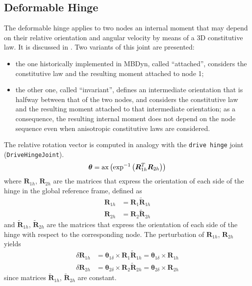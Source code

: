 \documentclass[10pt,dvips,fleqn,subeqn]{report}
\newcommand{\T}[1]{\bm{#1}}
\begin{document}
\subsection{Deformable Hinge}
\label{sec:constraints:deformable:deformable hinge}
The deformable hinge applies to two nodes an internal moment that may depend
on their relative orientation and angular velocity by means 
of a 3D constitutive law.
It is discussed in \cite{INVJOINT}.
Two variants of this joint are presented:
\begin{itemize}
\item the one historically implemented in MBDyn, called ``attached'',
considers the constitutive law and the resulting moment attached to node 1;
\item the other one, called ``invariant'', defines an intermediate
orientation that is halfway between that of the two nodes, and considers
the constitutive law and the resulting moment attached to that intermediate
orientation; as a consequence, the resulting internal moment does not depend
on the node sequence even when anisotropic constitutive laws are considered.
\end{itemize}
The relative rotation vector is computed in analogy with the \texttt{drive hinge}
joint (\texttt{DriveHingeJoint}).
\begin{equation}
	\T{\theta} =
	\llk{ax}\plbr{\llk{exp}^{-1}\plbr{\T{R}_{1h}^T \T{R}_{2h}}}
\end{equation}
where $\T{R}_{1h}$, $\T{R}_{2h}$ are the matrices that express
the orientation of each side of the hinge in the global reference frame,
defined as
\begin{subequations}
\begin{align}
	\T{R}_{1h} &= \T{R}_{1} \tilde{\T{R}}_{1h} \\
	\T{R}_{2h} &= \T{R}_{2} \tilde{\T{R}}_{2h}
\end{align}
\end{subequations}
and $\tilde{\T{R}}_{1h}$, $\tilde{\T{R}}_{2h}$ are the matrices
that express the orientation of each side of the hinge with respect
to the corresponding node.
The perturbation of $\T{R}_{1h}$, $\T{R}_{2h}$ yields
\begin{subequations}
\begin{align}
	\delta \T{R}_{1h} &= \T{\theta}_{1\delta} \times \T{R}_{1} \tilde{\T{R}}_{1h}
		= \T{\theta}_{1\delta} \times \T{R}_{1h} \\
	\delta \T{R}_{2h} &= \T{\theta}_{2\delta} \times \T{R}_{2} \tilde{\T{R}}_{2h}
		= \T{\theta}_{2\delta} \times \T{R}_{2h}
\end{align}
\end{subequations}
since matrices $\tilde{\T{R}}_{1h}$, $\tilde{\T{R}}_{2h}$ are constant.
\end{document}
